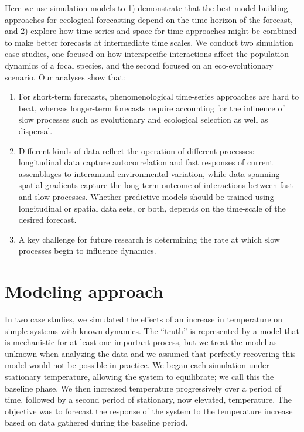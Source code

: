 \documentclass[11pt]{article}
\begin{document}
Here we use simulation models to 1) demonstrate that the best model-building approaches for ecological forecasting 
depend on the time horizon of the forecast, and 2) explore how time-series and space-for-time approaches might be 
combined to make better forecasts at intermediate time scales. We conduct two simulation case studies, one 
focused on how interspecific interactions affect the population dynamics of a focal species, and the second focused on
an eco-evolutionary scenario. Our analyses show that: 
\begin{enumerate}
	\item For short-term forecasts, phenomenological time-series approaches are hard to beat, whereas longer-term forecasts require accounting for the influence of slow processes such as evolutionary and ecological selection as well as dispersal.
	\item Different kinds of data reflect the operation of different processes: longitudinal data capture autocorrelation and fast responses of current assemblages to interannual environmental variation, while data spanning spatial gradients capture the long-term outcome of interactions between fast and slow processes.  Whether predictive models should be trained using longitudinal or spatial data sets, or both, depends on the time-scale of the desired forecast.
	\item A key challenge for future research is determining the rate at which slow processes begin to influence dynamics.
\end{enumerate}

\section*{Modeling approach}

In two case studies, we simulated the effects of an increase in temperature on simple systems with known dynamics.
The ``truth'' is represented by a model that is mechanistic for at least one important process, but we treat the model as unknown when
analyzing the data and we assumed that perfectly recovering this model would not be possible in practice. We began each simulation
under stationary temperature, allowing the system to equilibrate; we call this the baseline phase. 
We then increased temperature progressively over a period of time, followed by a second period of stationary, now elevated, temperature. 
The objective was to forecast the response of the system to the temperature increase based on data gathered during the baseline period. 
\end{document}

